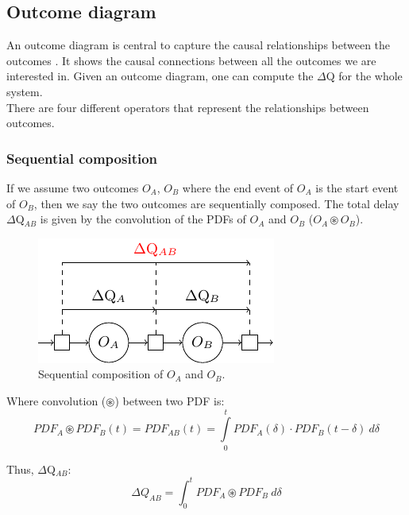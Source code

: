     \subsection{Outcome diagram}
        An outcome diagram is central to capture the causal relationships between the outcomes \cite{myo}. It shows the causal connections between all the outcomes we are interested in. Given an outcome diagram, one can compute the $\Delta$Q for the whole system. \\
        There are four different operators that represent the relationships between outcomes. \cite{dq-tut}
    \subsubsection{Sequential composition}
        If we assume two outcomes $O_A$, $O_B$ where the end event of $O_A$ is the start event of $O_B$, then we say the two outcomes are sequentially composed. The total delay $\Delta$Q$_{AB}$ is given by the convolution of the PDFs of $O_A$ and $O_B$ ($O_A \circledast O_B$). 
        \begin{figure}[H]
            \begin{center}
                \includegraphics[scale=1]{tikz/seq_comp.pdf}
            \end{center}
            \caption{Sequential composition of $O_A$ and $O_B$.}
        \end{figure}
        Where convolution ($\circledast$) between two PDF is:
        \begin{equation}
            PDF_A \circledast PDF_B (t) = PDF_{AB}(t) =\int\limits_0^t PDF_A(\delta) \cdot PDF_B(t-\delta) \  d\delta 
            \label{eq:conv_1}
        \end{equation}

        Thus, $\Delta$Q$_{AB}$:
        \begin{equation}
            \Delta Q_{AB} = \int_0^t PDF_{A} \circledast PDF_{B} \ d\delta
            \label{eq:convolution_pdf}
        \end{equation}

